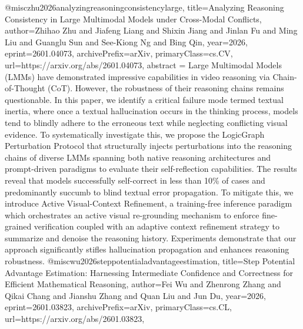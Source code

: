 {}@misc{zhu2026analyzingreasoningconsistencylarge,
      title={Analyzing Reasoning Consistency in Large Multimodal Models under Cross-Modal Conflicts}, 
      author={Zhihao Zhu and Jiafeng Liang and Shixin Jiang and Jinlan Fu and Ming Liu and Guanglu Sun and See-Kiong Ng and Bing Qin},
      year={2026},
      eprint={2601.04073},
      archivePrefix={arXiv},
      primaryClass={cs.CV},
      url={https://arxiv.org/abs/2601.04073},
      abstract = {Large Multimodal Models (LMMs) have demonstrated impressive capabilities in video reasoning via Chain-of-Thought (CoT). However, the robustness of their reasoning chains remains questionable. In this paper, we identify a critical failure mode termed textual inertia, where once a textual hallucination occurs in the thinking process, models tend to blindly adhere to the erroneous text while neglecting conflicting visual evidence. To systematically investigate this, we propose the LogicGraph Perturbation Protocol that structurally injects perturbations into the reasoning chains of diverse LMMs spanning both native reasoning architectures and prompt-driven paradigms to evaluate their self-reflection capabilities. The results reveal that models successfully self-correct in less than 10\% of cases and predominantly succumb to blind textual error propagation. To mitigate this, we introduce Active Visual-Context Refinement, a training-free inference paradigm which orchestrates an active visual re-grounding mechanism to enforce fine-grained verification coupled with an adaptive context refinement strategy to summarize and denoise the reasoning history. Experiments demonstrate that our approach significantly stifles hallucination propagation and enhances reasoning robustness.}
}@misc{wu2026steppotentialadvantageestimation,
      title={Step Potential Advantage Estimation: Harnessing Intermediate Confidence and Correctness for Efficient Mathematical Reasoning}, 
      author={Fei Wu and Zhenrong Zhang and Qikai Chang and Jianshu Zhang and Quan Liu and Jun Du},
      year={2026},
      eprint={2601.03823},
      archivePrefix={arXiv},
      primaryClass={cs.CL},
      url={https://arxiv.org/abs/2601.03823},
}
